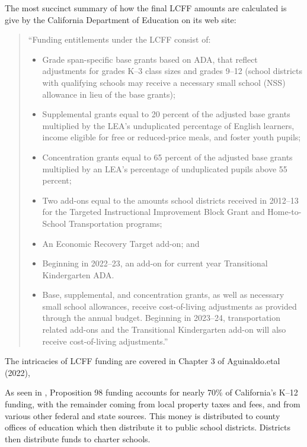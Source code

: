 The most succinct summary of how the final LCFF amounts are calculated is give by the California Department of Education on its web site:
\begin{quotation}
  \noindent{}``Funding entitlements under the LCFF consist of:
  \begin{itemize}
    \item Grade span-specific base grants based on ADA, that reflect adjustments for grades K–3 class sizes and grades 9–12 (school districts with qualifying schools may receive a necessary small school (NSS) allowance in lieu of the base grants);
    \item Supplemental grants equal to 20 percent of the adjusted base grants multiplied by the LEA’s unduplicated percentage of English learners, income eligible for free or reduced-price meals, and foster youth pupils;
    \item Concentration grants equal to 65 percent of the adjusted base grants multiplied by an LEA’s percentage of unduplicated pupils above 55 percent;
    \item Two add-ons equal to the amounts school districts received in 2012–13 for the Targeted Instructional Improvement Block Grant and Home-to-School Transportation programs;
    \item An Economic Recovery Target add-on; and
    \item Beginning in 2022–23, an add-on for current year Transitional Kindergarten ADA.
    \item Base, supplemental, and concentration grants, as well as necessary small school allowances, receive cost-of-living adjustments as provided through the annual budget. Beginning in 2023–24, transportation related add-ons and the Transitional Kindergarten add-on will also receive cost-of-living adjustments.''
  \end{itemize}
\end{quotation}

The intricacies of LCFF funding are covered in Chapter 3 of Aguinaldo.etal (2022), %

As seen in , Proposition 98 funding accounts for nearly 70\% of California's K–12 funding, with the remainder coming from local property taxes and fees, and from various other federal and state sources. This money is distributed to county offices of education which then distribute it to public school districts. Districts then distribute funds to charter schools.

